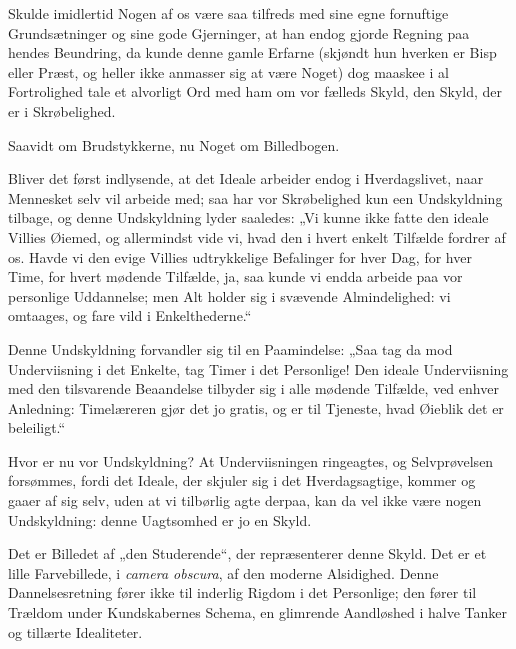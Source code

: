 \documentclass[12pt,a4paper]{book}
\newcommand{\apage}[1]{\marginnote{\footnotesize\textit{[#1]}}}
\begin{document}
Skulde imidlertid Nogen af os være saa tilfreds med sine egne fornuftige
Grundsætninger og sine gode Gjerninger, at han endog gjorde Regning paa
hendes Beundring, da kunde denne gamle Erfarne (skjøndt hun hverken er
Bisp eller Præst, og heller ikke anmasser sig at være Noget) dog maaskee
i al Fortrolighed tale et alvorligt Ord med ham om vor fælleds Skyld, den
Skyld, der er i Skrøbelighed.

Saavidt om Brudstykkerne, nu Noget om Billedbogen.

Bliver det først indlysende, at det Ideale arbeider endog i
Hverdagslivet, naar Mennesket selv vil arbeide med; saa har vor
Skrøbelighed kun een Undskyldning tilbage, og denne Undskyldning lyder
saaledes: „Vi kunne ikke fatte den ideale Villies Øiemed, og allermindst
vide vi, hvad den i hvert enkelt Tilfælde fordrer af os. Havde vi den
evige Villies udtrykkelige Befalinger for hver Dag, for hver Time, for
hvert mødende Tilfælde, ja, saa kunde vi endda arbeide paa vor personlige
Uddannelse; men Alt holder sig i svævende Almindelighed: vi omtaages, og
fare vild i Enkelthederne.“

Denne Undskyldning forvandler sig til en Paamindelse: „Saa tag da mod
Underviisning i det Enkelte, tag Timer i det Personlige! Den ideale
Underviisning med den tilsvarende Beaandelse tilbyder sig i alle mødende
Tilfælde, ved enhver Anledning: Timelæreren gjør det jo gratis, og er til
Tjeneste, hvad Øieblik det er beleiligt.“

Hvor er nu vor Undskyldning? At Underviisningen ringeagtes, og
Selvprøvelsen forsømmes, fordi det Ideale, der skjuler sig i det
Hverdagsagtige, kommer og gaaer af sig selv, uden at vi tilbørlig agte
derpaa, kan da vel ikke være nogen Undskyldning: denne Uagtsomhed er jo
en Skyld.
 \apage{101}

Det er Billedet af „den Studerende“, der repræsenterer denne Skyld. Det
er et lille Farvebillede, i \textit{camera obscura}, af den moderne
Alsidighed. Denne Dannelsesretning fører ikke til inderlig Rigdom i det
Personlige; den fører til Trældom under Kundskabernes Schema, en
glimrende Aandløshed i halve Tanker og tillærte Idealiteter.
\end{document}
